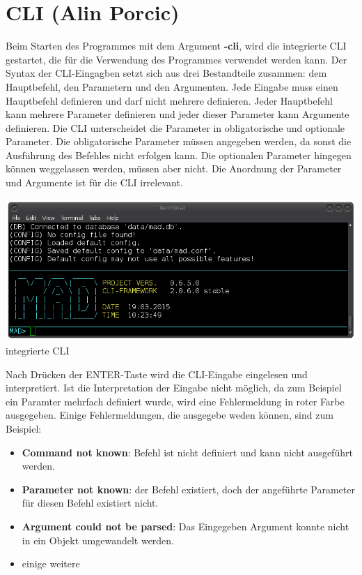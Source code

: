 \documentclass[12pt,a4paper]{report}
\begin{document}
\section{CLI (Alin Porcic)}

Beim Starten des Programmes mit dem Argument \textbf{-cli}, wird die integrierte CLI gestartet, die für die Verwendung des Programmes verwendet werden kann. Der Syntax der CLI-Eingagben setzt sich aus drei Bestandteile zusammen: dem Hauptbefehl, den Parametern und den Argumenten. Jede Eingabe muss einen Hauptbefehl definieren und darf nicht mehrere definieren. Jeder Hauptbefehl kann mehrere Parameter definieren und jeder dieser Parameter kann Argumente definieren. Die CLI unterscheidet die Parameter in obligatorische und optionale Parameter. Die obligatorische Parameter müssen angegeben werden, da sonst die Ausführung des Befehles nicht erfolgen kann. Die optionalen Parameter hingegen können weggelassen werden, müssen aber nicht. Die Anordnung der Parameter und Argumente ist für die CLI irrelevant.\\

\begin{center}
\includegraphics[scale=0.5]{img/cli_mad.png}\\
integrierte CLI
\end{center}

Nach Drücken der ENTER-Taste wird die CLI-Eingabe eingelesen und interpretiert. Ist die Interpretation der Eingabe nicht möglich, da zum Beispiel ein Paramter mehrfach definiert wurde, wird eine Fehlermeldung in roter Farbe ausgegeben. Einige Fehlermeldungen, die ausgegebe weden können, sind zum Beispiel:

\begin{itemize}
\item \textbf{Command not known}: Befehl ist nicht definiert und kann nicht ausgeführt werden.
\item \textbf{Parameter not known}: der Befehl existiert, doch der angeführte Parameter für diesen Befehl existiert nicht.
\item \textbf{Argument could not be parsed}: Das Eingegeben Argument konnte nicht in ein Objekt umgewandelt werden.
\item einige weitere
\end{itemize}
\end{document}
